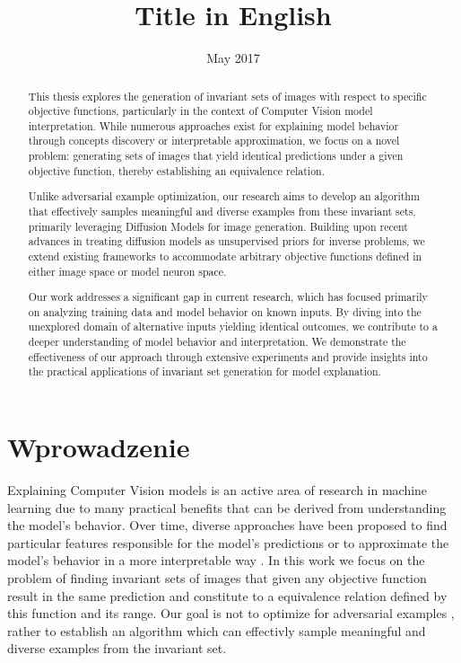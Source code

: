 \documentclass[licencjacka,en]{pracamgr}
\title{Title in English}
\date{May 2017}
\begin{document}
\maketitle

\begin{abstract}
  
  This thesis explores the generation of invariant sets of images with respect to specific objective functions, particularly in the context of Computer Vision model interpretation. While numerous approaches exist for explaining model behavior through concepts discovery or interpretable approximation, we focus on a novel problem: generating sets of images that yield identical predictions under a given objective function, thereby establishing an equivalence relation.

  Unlike adversarial example optimization, our research aims to develop an algorithm that effectively samples meaningful and diverse examples from these invariant sets, primarily leveraging Diffusion Models for image generation. Building upon recent advances in treating diffusion models as unsupervised priors for inverse problems, we extend existing frameworks to accommodate arbitrary objective functions defined in either image space or model neuron space.

  Our work addresses a significant gap in current research, which has focused primarily on analyzing training data and model behavior on known inputs. By diving into the unexplored domain of alternative inputs yielding identical outcomes, we contribute to a deeper understanding of model behavior and interpretation. We demonstrate the effectiveness of our approach through extensive experiments and provide insights into the practical applications of invariant set generation for model explanation.
\end{abstract}

\tableofcontents

\chapter*{Wprowadzenie}

Explaining Computer Vision models is an active area of research in machine learning due to many practical benefits that can be derived from understanding the model's behavior. Over time, diverse approaches have been proposed to find particular features responsible for the model's predictions or to approximate the model's behavior in a more interpretable way .
In this work we focus on the problem of finding invariant sets of images that given any objective function result in the same prediction and constitute to a equivalence relation defined by this function and its range.
Our goal is not to optimize for adversarial examples , rather to establish an algorithm which can effectivly sample meaningful and diverse examples from the invariant set.
\end{document}
